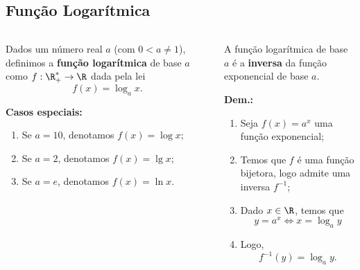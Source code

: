 \subsection{Função Logarítmica}
\begin{frame}
  \begin{columns}[onlytextwidth]
    \begin{column}{0.49\textwidth}\vspace{-0.55cm}
      \begin{definition}
        Dados um número real $a$ (com $0 < a \not= 1$), definimos a \textbf{função logarítmica} de base $a$ como $f:\R^{*}_{+}\rightarrow\R$ dada pela lei
        \begin{equation*}
          f(x) = \log_{a}{x}.
        \end{equation*}
      \end{definition}
      \textbf{Casos especiais:}
      \begin{enumerate}
        \item Se $a = 10$, denotamos $f(x) = \log{x}$;
        \item Se $a = 2$, denotamos $f(x) = \lg{x}$;
        \item Se $a = e$, denotamos $f(x) = \ln{x}$.
      \end{enumerate}
    \end{column}
    \begin{column}{0.49\textwidth}\vspace{-0.55cm}
      \begin{theorem}
        A função logarítmica de base $a$ é a \textbf{inversa} da função exponencial de base $a$.
      \end{theorem}
      \begin{highlight}
        \textbf{Dem.:}
        \begin{enumerate}
          \item Seja $f(x) = a^{x}$ uma função exponencial;
          \item Temos que $f$ é uma função bijetora, logo admite uma inversa $f^{-1}$;
          \item Dado $x\in\R$, temos que
          \begin{equation*}
            y=a^{x} \Leftrightarrow x = \log_{a}y
          \end{equation*}
          \item Logo,
          \begin{equation*}
            f^{-1}(y) = \log_{a}{y}.
          \end{equation*}
        \end{enumerate}
      \end{highlight}
    \end{column}
  \end{columns}
\end{frame}

